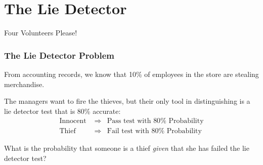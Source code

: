 \documentclass{beamer}
\begin{document}
\section{The Lie Detector}
\begin{frame}
\centering \Huge Four Volunteers Please!
\end{frame}

\begin{frame}
\frametitle{The Lie Detector Problem}
\begin{block}{From accounting records, we know that 10\% of employees in the store are stealing merchandise.}
\end{block}
\begin{block}{The managers want to fire the thieves, but their only tool in distinguishing is a lie detector test that is 80\% accurate:}
	\begin{eqnarray*}
	\mbox{Innocent } &\Rightarrow& \mbox{Pass test with } 80\% \mbox{ Probability}\\
	\mbox{Thief } &\Rightarrow& \mbox{Fail test with } 80\% \mbox{ Probability}
	\end{eqnarray*}
\end{block}

\pause
\begin{alertblock}{What is the probability that someone is a thief \emph{given} that she has failed the lie detector test? }
\end{alertblock}

\end{frame}
\end{document}
